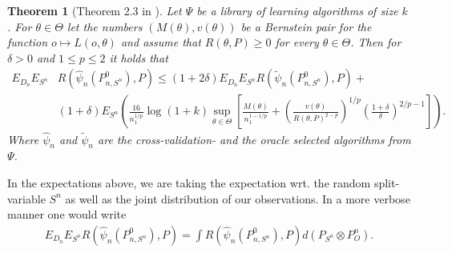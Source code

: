 \documentclass[11pt, a4paper]{article}
\newtheorem{theorem}{Theorem}
\theoremstyle{definition}
\theoremstyle{remark}
\newcommand{\ml}{k}
\newcommand{\btheta}{\theta}
\newcommand{\la}{\psi}
\newcommand{\Sn}{S^n}
\newcommand{\lib}{\Psi}
\begin{document}
\begin{theorem}[Theorem 2.3 in \parencite{vaart06}] \label{finitesample}
   Let $ \lib $ be a library of learning algorithms of size $ \ml $. For $ \btheta \in \Theta $ let the numbers $ (M(\btheta) , v(\btheta)) $ be a Bernstein pair for the function $ o \mapsto L(o, \btheta) $ and assume that $ R(\btheta, P) \geq 0 $ for every $ \btheta \in \Theta $. Then for $ \delta > 0 $ and $ 1 \leq p \leq 2 $ it holds that 
   \begin{align*}
       E_{D_n} E_{\Sn} &R(\hat{\la}_n(P_{n, \Sn}^{0}), P) \leq(1 + 2 \delta) E_{D_n} E_{\Sn} R( \tilde{\la}_n(P_{n,\Sn}^{0}), P) +\\
                       &(1 + \delta) E_{\Sn} \left(  \frac{16}{n_1^{1/p}} \log (1 +k) \sup_{\btheta \in \Theta} \left[ \frac{M(\btheta)}{n_1^{1-1/p}} +  \left( \frac{v(\btheta)}{R(\btheta, P)^{2-p}} \right)^{1/p} \left( \frac{1 + \delta}{\delta} \right)^{2/p-1} \right]\right).
   \end{align*}
   Where $ \hat{\la}_n $ and $ \tilde{\la}_n $ are the cross-validation- and the oracle selected algorithms from $ \lib $. 
\end{theorem}
In the expectations above, we are taking the expectation wrt. the random split-variable $ \Sn $ as well as the joint distribution of our observations. In a more verbose manner one would write 
\begin{align*}
    E_{D_n} E_{\Sn}  R(\hat{\la}_n(P_{n, \Sn}^{0}), P) = \int R(\hat{\la}_n(P_{n, \Sn}^{0}), P) d (P_{\Sn} \otimes  P^{n}_O ).
\end{align*}
\end{document}
